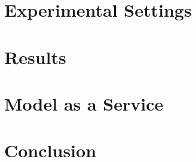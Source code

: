 \documentclass{UoYCSproject}
\begin{document}
\chapter{Experimental Settings}
\label{ch:experimental-settings}

\chapter{Results}
\label{ch:results}

\chapter{Model as a Service}
\label{ch:model-as-a-service}

\chapter{Conclusion}
\label{ch:conclusion}

\printbibliography
\end{document}
